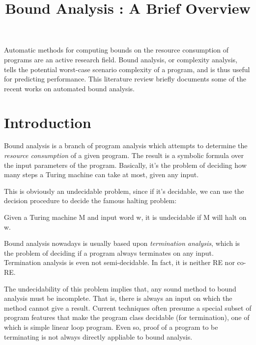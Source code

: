 
\begin{survey}
\label{cha:survey}

\title{
  Bound Analysis : A Brief Overview
}

\maketitle

Automatic methods for computing bounds on the resource consumption of programs are an active research field. Bound analysis, or complexity analysis, tells the potential worst-case scenario complexity of a program, and is thus useful for predicting performance. This literature review briefly documents some of the recent works on automated bound analysis. 

\tableofcontents

\section{Introduction}

Bound analysis is a branch of program analysis which attempts to determine the \textit{resource consumption} of a given program. The result is a symbolic formula over the input parameters of the program. Basically, it's the problem of deciding how many steps a Turing machine can take at most, given any input.

This is obviously an undecidable problem, since if it's decidable, we can use the decision procedure to decide the famous halting problem:

\begin{theorem}
  Given a Turing machine M and input word w, it is undecidable if M will halt on w.
\end{theorem}

Bound analysis nowadays is usually based upon \textit{termination analysis}{\cite{cook_proving_2011}}, which is the problem of deciding if a program always terminates on any input. Termination analysis is even not semi-decidable. In fact, it is neither RE nor co-RE.

The undecidability of this problem implies that, any sound method to bound analysis must be incomplete. That is, there is always an input on which the method cannot give a result. Current techniques often presume a special subset of program features that make the program class decidable (for termination), one of which is simple linear loop program. Even so, proof of a program to be terminating is not always directly appliable to bound analysis.


\end{survey}
